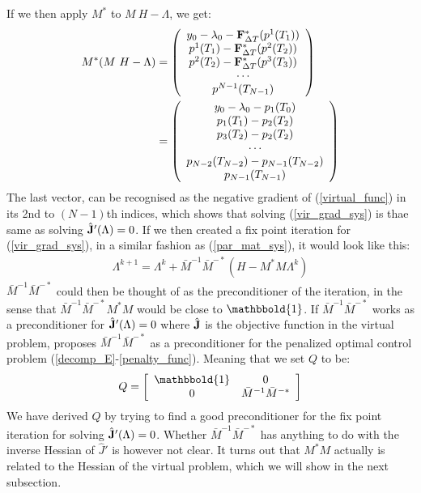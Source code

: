 If we then apply $M^*$ to $M \ H-\Lambda$, we get:
\begin{align}
M^* (M \ H-\Lambda)&=
	\left( \begin{array}{c}
	y_0-\lambda_0 -\bold{F}_{\Delta T}^*(p^1(T_1))\\
	 p^1(T_1)-\bold{F}_{\Delta T}^*(p^2( T_2))\\
	p^2( T_2)-\bold{F}_{\Delta T}^*(p^3( T_3))\\
	\cdots \\
	p^{N-1}(T_{N-1})
	\end{array} \right)
	\\
	&=\left( \begin{array}{c}
	y_0-\lambda_0 - p_1(T_0)\\
	p_1(T_1)-p_2(T_2)\\
	p_3(T_2)-p_2(T_2)\\
	\cdots \\
	p_{N-2}(T_{N-2})-p_{N-1}(T_{N-2}) \\
	p_{N-1}(T_{N-1})
	\end{array} \right)
\end{align}
The last vector, can be recognised as the negative gradient of (\ref{virtual_func}) in its 2nd to $(N-1)$th indices, which shows that solving (\ref{vir_grad_sys}) is thae same as solving $\hat {\bold J}'(\Lambda)=0$. If we then created a fix point iteration for (\ref{vir_grad_sys}), in a similar fashion as (\ref{par_mat_sys}), it would look like this:
\begin{align*}
\Lambda^{k+1} = \Lambda^k + \bar{M}^{-1}\bar M^{-*}(H-M^*M\Lambda^k)
\end{align*}
$\bar{M}^{-1}\bar{M}^{-*}$ could then be thought of as the preconditioner of the iteration, in the sense that $\bar{M}^{-1}\bar{M}^{-*}M^*M$ would be close to $\mathbbold{1}$. If $\bar{M}^{-1}\bar{M}^{-*}$ works as a preconditioner for  $\hat {\bold J}'(\Lambda)=0$ where $\hat {\bold J}$ is the objective function in the virtual problem, \cite{maday2002parareal} proposes $\bar{M}^{-1}\bar{M}^{-*}$ as a preconditioner for the penalized optimal control problem (\ref{decomp_E}-\ref{penalty_func}). Meaning that we set $Q$ to be:
\begin{align}
Q = \left[ \begin{array}{cc}
	\mathbbold{1} & 0 \\
	0 &  \bar{M}^{-1}\bar{M}^{-*}\\
	\end{array} \right]
\end{align}  
We have derived $Q$ by trying to find a good preconditioner for the fix point iteration for solving $\hat {\bold J}'(\Lambda)=0$. Whether $\bar{M}^{-1}\bar{M}^{-*}$ has anything to do with the inverse Hessian of $\hat J'$ is however not clear. It turns out that $M^*M$ actually is related to the Hessian of the virtual problem, which we will show in the next subsection.
